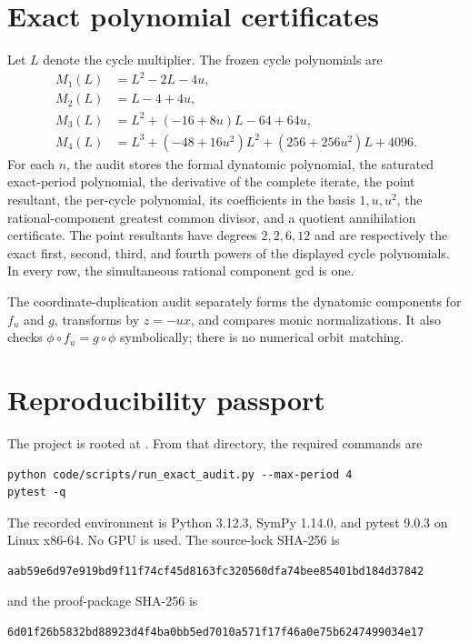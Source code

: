 \documentclass[11pt]{article}
\theoremstyle{remark}
\begin{document}
\section{Exact polynomial certificates}
\label{app:polynomials}

Let \(L\) denote the cycle multiplier.  The frozen cycle polynomials are
\begin{align}
 M_1(L)&=L^2-2L-4u,\\
 M_2(L)&=L-4+4u,\\
 M_3(L)&=L^2+(-16+8u)L-64+64u,\\
 M_4(L)&=L^3+(-48+16u^2)L^2+(256+256u^2)L+4096.
\end{align}
For each \(n\), the audit stores the formal dynatomic polynomial, the saturated
exact-period polynomial, the derivative of the complete iterate, the point
resultant, the per-cycle polynomial, its coefficients in the basis
\(1,u,u^2\), the rational-component greatest common divisor, and a quotient
annihilation certificate.  The point resultants have degrees \(2,2,6,12\)
and are respectively the exact first, second, third, and fourth powers of the
displayed cycle polynomials.  In every row, the simultaneous rational
component gcd is one.

The coordinate-duplication audit separately forms the dynatomic components
for \(f_u\) and \(g\), transforms by \(z=-ux\), and compares monic
normalizations.  It also checks \(\phi\circ f_u=g\circ\phi\) symbolically;
there is no numerical orbit matching.

\section{Reproducibility passport}
\label{app:reproducibility}

The project is rooted at
\texttt{}.  From that
directory, the required commands are
\begin{verbatim}
python code/scripts/run_exact_audit.py --max-period 4
pytest -q
\end{verbatim}
The recorded environment is Python 3.12.3, SymPy 1.14.0, and pytest 9.0.3 on
Linux x86-64.  No GPU is used.  The source-lock SHA-256 is
\begin{verbatim}
aab59e6d97e919bd9f11f74cf45d8163fc320560dfa74bee85401bd184d37842
\end{verbatim}
and the proof-package SHA-256 is
\begin{verbatim}
6d01f26b5832bd88923d4f4ba0bb5ed7010a571f17f46a0e75b6247499034e17
\end{verbatim}
\end{document}
